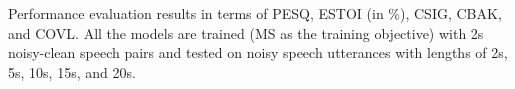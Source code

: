 \begin{table}[!t]
    \centering
    \scriptsize
    \small
    \def\arraystretch{0.91}
    \setlength{\tabcolsep}{3.3pt}
    \setlength{\abovetopsep}{0pt}
    \setlength\belowbottomsep{0pt} 
    \setlength\aboverulesep{0pt} 
    \setlength\belowrulesep{0pt}
    \caption{Performance evaluation results in terms of PESQ, ESTOI (in \%), CSIG, CBAK, and COVL. All the models are trained (MS as the training objective) with 2s noisy-clean speech pairs and tested on noisy speech utterances with lengths of 2s, 5s, 10s, 15s, and 20s.}
    \label{tab:magmag2s}
    

\end{table}
